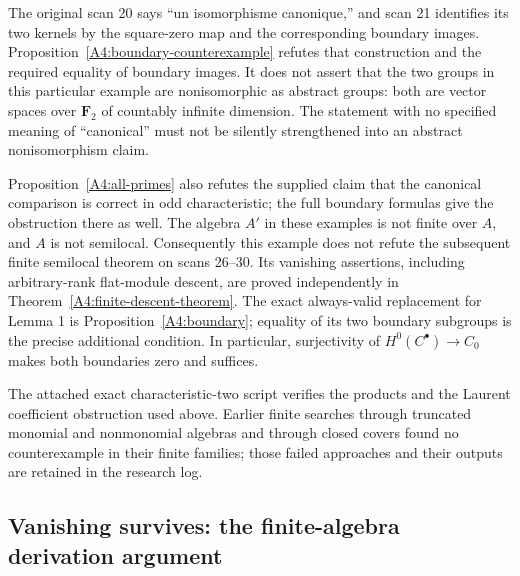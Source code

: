 \begin{remark}\label{A4:boundary-gate}
The original scan 20 says ``un isomorphisme canonique,'' and scan 21
identifies its two kernels by the square-zero map and the corresponding
boundary images.  Proposition~\ref{A4:boundary-counterexample} refutes
that construction and the required equality of boundary images.
It does not assert that the two groups in this particular example are
nonisomorphic as abstract groups: both are vector spaces over $\mathbf F_2$
of countably infinite dimension.  The statement with no specified meaning
of ``canonical'' must not be silently strengthened into an abstract
nonisomorphism claim.

Proposition~\ref{A4:all-primes} also refutes the supplied claim that the
canonical comparison is correct in odd characteristic; the full
boundary formulas give the obstruction there as well.
The algebra $A'$ in these examples is not finite over $A$, and $A$ is not semilocal.
Consequently this example does not refute the subsequent finite semilocal
theorem on scans 26--30.  Its vanishing assertions, including arbitrary-rank
flat-module descent, are proved independently in
Theorem~\ref{A4:finite-descent-theorem}.  The exact always-valid replacement for Lemma 1 is
Proposition~\ref{A4:boundary}; equality of its two boundary subgroups is
the precise additional condition.  In particular, surjectivity of
$H^0(C^\bullet)\to C_0$ makes both boundaries zero and suffices.

The attached exact characteristic-two script verifies the products and
the Laurent coefficient obstruction used above.  Earlier finite searches
through truncated monomial and nonmonomial algebras and through closed
covers found no counterexample in their finite families; those failed
approaches and their outputs are retained in the research log.
\end{remark}

\subsection{Vanishing survives: the finite-algebra derivation argument}

